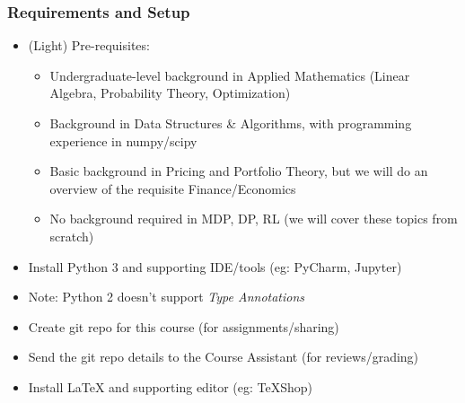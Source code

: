 \documentclass[handout]{beamer}
\begin{document}
\begin{frame}
\frametitle{Requirements and Setup}
\pause
\begin{itemize}[<+->]
\item (Light) Pre-requisites:
\begin{itemize}
\item Undergraduate-level background in Applied Mathematics (Linear Algebra, Probability Theory, Optimization)
\item Background in Data Structures \& Algorithms, with programming experience in numpy/scipy
\item Basic background in Pricing and Portfolio Theory, but we will do an overview of the requisite Finance/Economics
\item No background required in MDP, DP, RL (we will cover these topics from scratch)
\end{itemize}
\item Install Python 3 and supporting IDE/tools (eg: PyCharm, Jupyter)
\item Note: Python 2 doesn't support {\em Type Annotations}
\item Create git repo for this course (for assignments/sharing)
\item Send the git repo details to the Course Assistant (for reviews/grading)
\item Install LaTeX and supporting editor (eg: TeXShop)
\end{itemize}
\end{frame}
\end{document}
